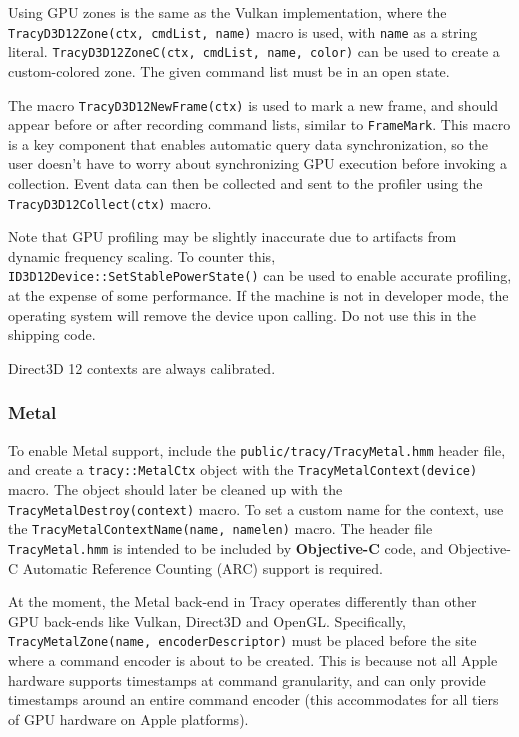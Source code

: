 \documentclass[hidelinks,titlepage,a4paper,twoside]{article}
\begin{document}
Using GPU zones is the same as the Vulkan implementation, where the \texttt{TracyD3D12Zone(ctx, cmdList, name)} macro is used, with \texttt{name} as a string literal. \texttt{TracyD3D12ZoneC(ctx, cmdList, name, color)} can be used to create a custom-colored zone. The given command list must be in an open state.

The macro \texttt{TracyD3D12NewFrame(ctx)} is used to mark a new frame, and should appear before or after recording command lists, similar to \texttt{FrameMark}. This macro is a key component that enables automatic query data synchronization, so the user doesn't have to worry about synchronizing GPU execution before invoking a collection. Event data can then be collected and sent to the profiler using the \texttt{TracyD3D12Collect(ctx)} macro.

Note that GPU profiling may be slightly inaccurate due to artifacts from dynamic frequency scaling. To counter this, \texttt{ID3D12Device::SetStablePowerState()} can be used to enable accurate profiling, at the expense of some performance. If the machine is not in developer mode, the operating system will remove the device upon calling. Do not use this in the shipping code.

Direct3D 12 contexts are always calibrated.

\subsubsection{Metal}

To enable Metal support, include the \texttt{public/tracy/TracyMetal.hmm} header file, and create a \texttt{tracy::MetalCtx} object with the \texttt{TracyMetalContext(device)} macro. The object should later be cleaned up with the \texttt{TracyMetalDestroy(context)} macro. To set a custom name for the context, use the \texttt{TracyMetalContextName(name, namelen)} macro. The header file \texttt{TracyMetal.hmm} is intended to be included by \textbf{Objective-C} code, and Objective-C Automatic Reference Counting (ARC) support is required.

At the moment, the Metal back-end in Tracy operates differently than other GPU back-ends like Vulkan, Direct3D and OpenGL. Specifically, \texttt{TracyMetalZone(name, encoderDescriptor)} must be placed before the site where a command encoder is about to be created. This is because not all Apple hardware supports timestamps at command granularity, and can only provide timestamps around an entire command encoder (this accommodates for all tiers of GPU hardware on Apple platforms).
\end{document}
